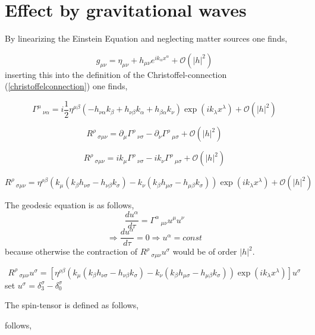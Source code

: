 \documentclass[12pt,a4paper]{article}
\begin{document}
	
	
	\section{Effect by gravitational waves}
	By linearizing the Einstein Equation and neglecting matter sources one finds,
	
	$$
	g_{\mu \nu } = \eta_{\mu \nu } + h_{\mu \nu }e^{i k_\alpha x^\alpha} + \mathcal{O}(|h|^2)
	$$
	inserting this into the definition of the Christoffel-connection (\ref{christoffelconnection}) one finds,
	
	$$
	\Gamma^{\mu}\,_{\nu \alpha} = i\frac{1}{2}\eta^{\mu \beta}  \left(-h_{\nu \alpha} k_{\beta}+h_{\nu \beta} k_{\alpha}+h_{\beta \alpha} k_{\nu}\right)  \exp\left(i k_{\lambda} x^{\lambda}\right) +  \mathcal{O}(|h|^2)
	$$
	
	
	$$
	R^{\rho}\,_{\sigma \mu \nu} = \partial_\mu \Gamma^{\rho}\,_{\nu \sigma} - \partial_\nu \Gamma^{\rho}\,_{\mu \sigma} + \mathcal{O}(|h|^2)
	$$
	
	$$
	R^{\rho}\,_{\sigma \mu \nu} = i k_\mu \Gamma^{\rho}\,_{\nu \sigma} -  i k_\nu \Gamma^{\rho}\,_{\mu \sigma} + \mathcal{O}(|h|^2)
	$$
	
	$$
	R^{\rho}\,_{\sigma \mu \nu} = \eta^{\rho \beta}\left(k_\mu \left(k_\beta h_{\nu \sigma} - h_{\nu \beta}  k_\sigma \right) - k_\nu \left( k_\beta h_{\mu \sigma} - h_{\mu \beta}  k_\sigma\right) \right) \exp\left(i k_{\lambda} x^{\lambda}\right)  + \mathcal{O}(|h|^2)
	$$
	
	The geodesic equation is as follows,
	$$
	\frac{du^\alpha}{d \tau} = \Gamma^{\alpha}\,_{\mu \nu}u^\mu u^\nu
	$$
	$$%
	\Rightarrow
	\frac{du^\alpha}{d \tau} = 0
	\Rightarrow u^\alpha = const
	$$
	because otherwise the contraction of $R^{\rho}\,_{\sigma \mu \nu}u^\sigma$ would be of order $|h|^2$.
	
	$$
	R^{\rho}\,_{\sigma \mu \nu}u^\sigma = \left[\eta^{\rho \beta}\left(k_\mu \left(k_\beta h_{\nu \sigma} - h_{\nu \beta}  k_\sigma \right) - k_\nu \left( k_\beta h_{\mu \sigma} - h_{\mu \beta}  k_\sigma\right) \right) \exp\left(i k_{\lambda} x^{\lambda}\right)\right] u^\sigma
	$$
	set $u^\sigma = \delta^\sigma_3 - \delta^\sigma_0$
	
	The spin-tensor is defined as follows,
	
	follows,
	
\end{document}
